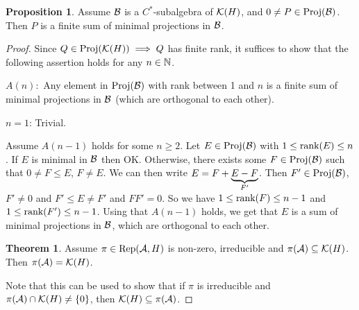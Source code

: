 \documentclass[10pt,english,a4paper]{article}
\theoremstyle{definition}
\newtheorem*{theorem}{Theorem}
\newtheorem*{proposition}{Proposition}
\DeclareMathOperator{\Rep}{Rep}
\DeclareMathOperator{\Proj}{Proj}
\begin{document}
\begin{proposition}
    Assume $\mathcal{B}$ is a $C^*$-subalgebra of $\mathcal{K}(H)$, and $0\neq P\in \Proj(\Bs)$.
Then $P$ is a finite sum of minimal projections in $\mathcal{B}$.
\end{proposition}
\begin{proof}
    Since $Q \in \Proj(\Ks(H)) \implies Q$ has finite rank, it suffices to show that the
following assertion holds for any $n\in \mathbb{N}$. 

$A(n):$ Any element in $\Proj(\Bs)$ with rank between 1 and $n$ is a finite sum of 
minimal projections in $\mathcal{B}$ (which are orthogonal to each other).

\ul{$n=1$}: Trivial.

Assume $A(n-1)$ holds for some $n\geq 2$.
Let $E \in \Proj(\Bs)$ with $1\leq \textnormal{rank}(E)\leq n$.
If $E$ is minimal in $\mathcal{B}$ then OK. Otherwise, there exists some $F \in \Proj (\Bs)$
such that $0\neq F \leq E$, $F\neq E$. We can then write $E = F + \underbrace{E - F}_{F'}$.
Then $F' \in \Proj(\Bs)$, $F' \neq 0$ and $F'\leq E \neq F'$ and $FF' = 0$.
So we have $1\leq \textnormal{rank}(F)\leq n-1$ and $1\leq \textnormal{rank}(F') \leq n-1$.
Using that $A(n-1)$ holds, we get that $E$ is a sum of minimal projections in $\mathcal{B}$,
which are orthogonal to each other.

\begin{theorem}
    Assume $\pi \in \Rep(\As,H)$ is non-zero, irreducible and $\pi(\mathcal{A}) \subseteq\mathcal{K}(H)$.
Then $\pi(\mathcal{A}) = \mathcal{K}(H)$.
\end{theorem}
Note that this can be used to show that if $\pi$ is irreducible and
$\pi(\mathcal{A})\cap \mathcal{K}(H)\neq \{0\}$, then $\mathcal{K}(H)\subseteq \pi(\mathcal{A})$.
\end{proof}
\end{document}
